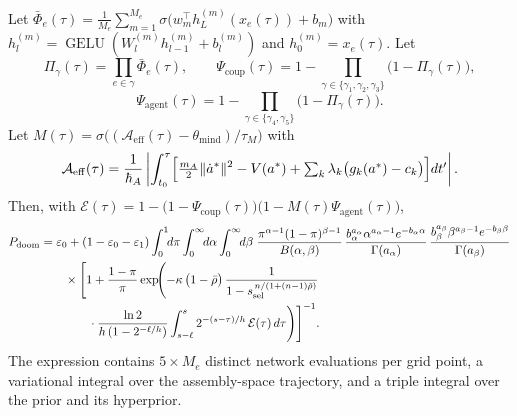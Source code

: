 \documentclass[11pt]{article}
\theoremstyle{remark}
\DeclareMathOperator{\GELU}{GELU}
\newcommand{\PD}{P_{\mathrm{doom}}}
\newcommand{\Aeff}{\mathcal{A}_{\mathrm{eff}}}
\newcommand{\rhobar}{\bar{\rho}}
\newcommand{\eone}{\varepsilon_1}
\newcommand{\ezero}{\varepsilon_0}
\begin{document}
Let $\bar\Phi_e(\tau)=\frac1{M_e}\sum_{m=1}^{M_e}\sigma\!\bigl(w_m^{\top}h^{(m)}_{L}(x_e(\tau))+b_m\bigr)$ with $h^{(m)}_l=\GELU(W^{(m)}_l h^{(m)}_{l-1}+b^{(m)}_l)$ and $h^{(m)}_0=x_e(\tau)$. Let
\[
\Pi_\gamma(\tau)=\prod_{e\in\gamma}\bar\Phi_e(\tau),\qquad
\Psi_{\mathrm{coup}}(\tau)=1-\prod_{\gamma\in\{\gamma_1,\gamma_2,\gamma_3\}}\bigl(1-\Pi_\gamma(\tau)\bigr),
\]
\[
\Psi_{\mathrm{agent}}(\tau)=1-\prod_{\gamma\in\{\gamma_4,\gamma_5\}}\bigl(1-\Pi_\gamma(\tau)\bigr).
\]
Let $M(\tau)=\sigma\bigl((\Aeff(\tau)-\theta_{\mathrm{mind}})/\tau_M\bigr)$ with
\[
\Aeff(\tau)=\frac1{\hbar_A}\left|\int_{t_0}^{\tau}\Bigl[\tfrac{m_A}{2}\|\dot a^{\ast}\|^{2}-V(a^{\ast})+\textstyle\sum_{k}\lambda_k\bigl(g_k(a^{\ast})-c_k\bigr)\Bigr]dt'\right|.
\]
Then, with $\mathcal{E}(\tau)=1-\bigl(1-\Psi_{\mathrm{coup}}(\tau)\bigr)\bigl(1-M(\tau)\Psi_{\mathrm{agent}}(\tau)\bigr)$,
\begin{align}
\PD&=\ezero+(1-\ezero-\eone)\int_0^1\!\!d\pi\int_0^\infty\!\!d\alpha\int_0^\infty\!\!d\beta\;
\frac{\pi^{\alpha-1}(1-\pi)^{\beta-1}}{B(\alpha,\beta)}\,
\frac{b_\alpha^{a_\alpha}\alpha^{a_\alpha-1}e^{-b_\alpha\alpha}}{\Gamma(a_\alpha)}\,
\frac{b_\beta^{a_\beta}\beta^{a_\beta-1}e^{-b_\beta\beta}}{\Gamma(a_\beta)}\notag\\
&\qquad\times\Biggl[1+\frac{1-\pi}{\pi}\exp\!\Biggl(-\kappa\,\bigl(1-\rhobar\bigr)\,\frac{1}{1-s_{\mathrm{sel}}^{\,n/(1+(n-1)\rhobar)}}\notag\\
&\qquad\qquad\cdot\frac{\ln 2}{h\,(1-2^{-\ell/h})}\int_{s-\ell}^{s}2^{-(s-\tau)/h}\,\mathcal{E}(\tau)\,d\tau\Biggr)\Biggr]^{-1}.
\end{align}
The expression contains $5\times M_e$ distinct network evaluations per grid point, a variational integral over the assembly-space trajectory, and a triple integral over the prior and its hyperprior.
\end{document}
